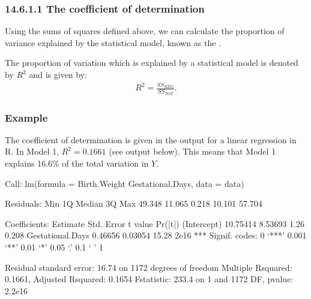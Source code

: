 \documentclass[letterpaper,10pt,english]{jupyterBook}
\begin{document}
\subsubsection{14.6.1.1 The coefficient of determination}
\label{\detokenize{14.g. Linear Regression III:the-coefficient-of-determination}}
\sphinxAtStartPar
Using the sums of squares defined above, we can calculate the proportion of variance explained by the statistical model, known as the .

\sphinxAtStartPar
The proportion of variation which is explained by a statistical model is denoted by \(R^2\) and is given by:
\begin{equation*}
\begin{split}
R^2 = \frac{SS_{REG}}{SS_{TOT}}.
\end{split}
\end{equation*}

\subsubsection{Example}
\label{\detokenize{14.g. Linear Regression III:example}}
\sphinxAtStartPar
The coefficient of determination is given in the  output for a linear regression in R. In Model 1, \(R^2=0.1661\) (see output below). This means that Model 1 explains 16.6\% of the total variation in \(Y\).

\begin{sphinxVerbatim}[commandchars=\\\{\}]
 
 
\end{sphinxVerbatim}

\begin{sphinxVerbatim}[commandchars=\\\{\}]
Call:
lm(formula = Birth.Weight \PYGZti{} Gestational.Days, data = data)

Residuals:
    Min      1Q  Median      3Q     Max 
\PYGZhy{}49.348 \PYGZhy{}11.065   0.218  10.101  57.704 

Coefficients:
                  Estimate Std. Error t value Pr(\PYGZgt{}|t|)    
(Intercept)      \PYGZhy{}10.75414    8.53693   \PYGZhy{}1.26    0.208    
Gestational.Days   0.46656    0.03054   15.28   \PYGZlt{}2e\PYGZhy{}16 ***
\PYGZhy{}\PYGZhy{}\PYGZhy{}
Signif. codes:  0 ‘***’ 0.001 ‘**’ 0.01 ‘*’ 0.05 ‘.’ 0.1 ‘ ’ 1

Residual standard error: 16.74 on 1172 degrees of freedom
Multiple R\PYGZhy{}squared:  0.1661,	Adjusted R\PYGZhy{}squared:  0.1654 
F\PYGZhy{}statistic: 233.4 on 1 and 1172 DF,  p\PYGZhy{}value: \PYGZlt{} 2.2e\PYGZhy{}16
\end{sphinxVerbatim}
\end{document}
